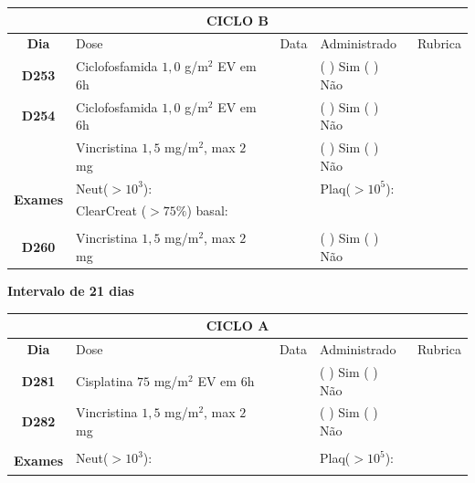 \documentclass[11pt,a4paper,oldfontcommands]{memoir}
\begin{document}
\begin{center}
    \begin{table}[H]
    \begin{tabular}{p{1cm}p{6cm}|p{1cm}|p{3cm}|p{2.5cm}}
    \hline
	\multicolumn{5}{c}{\textbf{CICLO B}}\\
	\hline
    \multicolumn{1}{c|}{\multirow{1}{*}{\textbf{Dia}}}&{Dose}&{Data}&{Administrado}&{Rubrica} \\
    \hline
    \multicolumn{1}{c|}{\multirow{1}{*}{\textbf{D253}}}&{Ciclofosfamida \(1,0\) g/m\(^2\) EV em 6h}&&{(  ) Sim (  ) Não}&\\
    \multicolumn{1}{c|}{\multirow{1}{*}{\textbf{D254}}}&{Ciclofosfamida \(1,0\) g/m\(^2\) EV em 6h}&&{(  ) Sim (  ) Não}&\\
    \multicolumn{1}{c|}{\multirow{1}{*}{\textbf{}}}&{Vincristina \(1,5\) mg/m\(^2\), max \(2\) mg}&&{(  ) Sim (  ) Não}&\\
    \hline
    \multicolumn{1}{c|}{\multirow{2}{*}{\textbf{Exames}}}&\multicolumn{2}{l|}{Neut(\(>10^3\)):}&{Plaq(\(>10^5\)):}&\\
    \cline{2-5}
    \multicolumn{1}{c|}{\multirow{2}{*}{{}}}&\multicolumn{2}{l|}{ClearCreat (\(>75\%\)) basal:}&{}&{}\\
    \hline
    \\
    \hline
    \multicolumn{1}{c|}{\multirow{1}{*}{\textbf{D260}}}&{Vincristina \(1,5\) mg/m\(^2\), max \(2\) mg}&&{(  ) Sim (  ) Não}&\\
    \hline
\end{tabular}
\end{table}
\textbf{Intervalo de 21 dias}
\begin{table}[H]
\begin{tabular}{p{1cm}p{6cm}|p{1cm}|p{3cm}|p{2.5cm}}
	\hline
	\multicolumn{5}{c}{\textbf{CICLO A}}\\
\hline
    \multicolumn{1}{c|}{\multirow{1}{*}{\textbf{Dia}}}&{Dose}&{Data}&{Administrado}&{Rubrica} \\
    \hline
    \multicolumn{1}{c|}{\multirow{1}{*}{\textbf{D281}}}&{Cisplatina \(75\) mg/m\(^2\) EV em 6h}&&{(  ) Sim (  ) Não}&\\
    \multicolumn{1}{c|}{\multirow{1}{*}{\textbf{D282}}}&{Vincristina \(1,5\) mg/m\(^2\), max \(2\) mg}&&{(  ) Sim (  ) Não}&\\
    \multicolumn{1}{c|}{\multirow{1}{*}{\textbf{}}}&&&&\\
    \hline
    \multicolumn{1}{c|}{\multirow{2}{*}{\textbf{Exames}}}&\multicolumn{2}{l|}{Neut(\(>10^3\)):}&{Plaq(\(>10^5\)):}&\\
    \cline{2-5}

\end{tabular}
\end{table}
\end{center}
\end{document}
